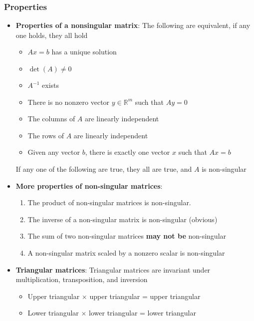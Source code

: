 \documentclass{report}
\begin{document}
    \subsubsection{Properties}
    \begin{itemize}
        \item \textbf{Properties of a nonsingular matrix}:
            The following are equivalent, if any one holds, they all hold
            \begin{itemize}
                \item $Ax = b$ has a unique solution
                \item $\det(A)\ne 0$
                \item $A^{-1}$ exists
                \item There is no nonzero vector $y \in \mathbb{R}^{m}$ such that $Ay=0 $
                \item The columns of $A$ are linearly independent
                \item The rows of $A$ are linearly independent
                \item Given any vector $b$, there is exactly one vector $x$ such that $Ax=b$
            \end{itemize}
            If any one of the following are true, they all are true, and $A$ is non-singular
        \item \textbf{More properties of non-singular matrices}:
            \begin{enumerate}
                \item The product of non-singular matrices is non-singular.
                \item The inverse of a non-singular matrix is non-singular (obvious)
                \item The sum of two non-singular matrices \textbf{may not be} non-singular
                \item A non-singular matrix scaled by a nonzero scalar is non-singular
            \end{enumerate}
        \item \textbf{Triangular matrices}: 
            Triangular matrices are invariant under multiplication, transposition, and inversion
            \begin{itemize}
                \item Upper triangular $\times$ upper triangular = upper triangular
                \item Lower triangular $\times$ lower triangular = lower triangular

\end{itemize}
\end{itemize}
\end{document}
